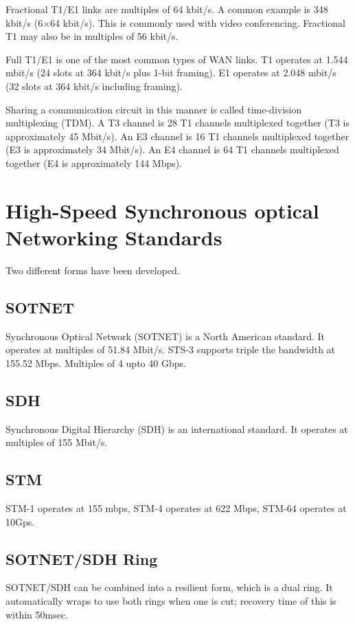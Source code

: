 Fractional T1/E1 links are multiples of 64 kbit/s. A common example is 348 kbit/s (6$\times$64 kbit/s). This is commonly used with video conferencing. Fractional T1 may also be in multiples of 56 kbit/s. 

Full T1/E1 is one of the most common types of WAN links. T1 operates at 1.544 mbit/s (24 slots at 364 kbit/s plus 1-bit framing). E1 operates at 2.048 mbit/s (32 slots at 364 kbit/s including framing). 

Sharing a communication circuit in this manner is called time-division multiplexing (TDM). A T3 channel is 28 T1 channels multiplexed together (T3 is approximately 45 Mbit/s). An E3 channel is 16 T1 channels multiplexed together (E3 is approximately 34 Mbit/s). An E4 channel is 64 T1 channels multiplexed together (E4 is approximately 144 Mbps). 

\section*{High-Speed Synchronous optical Networking Standards}
Two different forms have been developed.
\subsection*{SOTNET}
Synchronous Optical Network (SOTNET) is a North American standard. It operates at multiples of 51.84 Mbit/s. STS-3 supports triple the bandwidth at 155.52 Mbps. Multiples of 4 upto 40 Gbps.

\subsection*{SDH}
Synchronous Digital Hierarchy (SDH) is an international standard. It operates at multiples of 155 Mbit/s. 

\subsection*{STM}
STM-1 operates at 155 mbps, STM-4 operates at 622 Mbps, STM-64 operates at 10Gps.

\subsection*{SOTNET/SDH Ring}
SOTNET/SDH can be combined into a resilient form, which is a dual ring. It automatically wraps to use both rings when one is cut; recovery time of this is within 50msec.